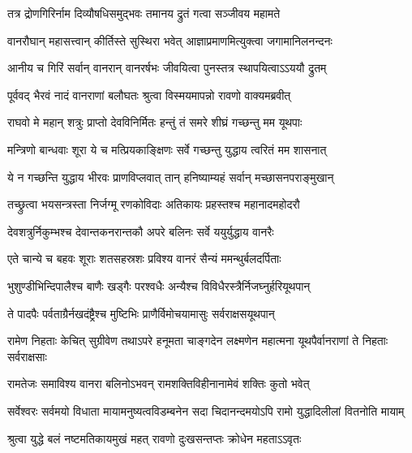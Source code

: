 \twolineshloka
{तत्र द्रोणगिरिर्नाम दिव्यौषधिसमुद्भवः}
{तमानय द्रुतं गत्वा सञ्जीवय महामते} %

\twolineshloka
{वानरौघान् महासत्त्वान् कीर्तिस्ते सुस्थिरा भवेत्}
{आज्ञाप्रमाणमित्युक्त्वा जगामानिलनन्दनः} %

\twolineshloka
{आनीय च गिरिं सर्वान् वानरान् वानरर्षभः}
{जीवयित्वा पुनस्तत्र स्थापयित्वाऽऽययौ द्रुतम्} %

\twolineshloka
{पूर्ववद् भैरवं नादं वानराणां बलौघतः}
{श्रुत्वा विस्मयमापन्नो रावणो वाक्यमब्रवीत्} %

\twolineshloka
{राघवो मे महान् शत्रुः प्राप्तो देवविनिर्मितः}
{हन्तुं तं समरे शीघ्रं गच्छन्तु मम यूथपाः} %

\twolineshloka
{मन्त्रिणो बान्धवाः शूरा ये च मत्प्रियकाङ्क्षिणः}
{सर्वे गच्छन्तु युद्धाय त्वरितं मम शासनात्} %

\twolineshloka
{ये न गच्छन्ति युद्धाय भीरवः प्राणविप्लवात्}
{तान् हनिष्याम्यहं सर्वान् मच्छासनपराङ्मुखान्} %

\twolineshloka
{तच्छ्रुत्वा भयसन्त्रस्ता निर्जग्मू रणकोविदाः}
{अतिकायः प्रहस्तश्च महानादमहोदरौ} %

\twolineshloka
{देवशत्रुर्निकुम्भश्च देवान्तकनरान्तकौ}
{अपरे बलिनः सर्वे ययुर्युद्धाय वानरैः} %

\twolineshloka
{एते चान्ये च बहवः शूराः शतसहस्रशः}
{प्रविश्य वानरं सैन्यं ममन्थुर्बलदर्पिताः} %

\twolineshloka
{भुशुण्डीभिन्दिपालैश्च बाणैः खड्गैः परश्वधैः}
{अन्यैश्च विविधैरस्त्रैर्निजघ्नुर्हरियूथपान्} %

\twolineshloka
{ते पादपैः पर्वताग्रैर्नखदंष्ट्रैश्च मुष्टिभिः}
{प्राणैर्विमोचयामासुः सर्वराक्षसयूथपान्} %

\threelineshloka
{रामेण निहताः केचित् सुग्रीवेण तथाऽपरे}
{हनूमता चाङ्गदेन लक्ष्मणेन महात्मना}
{यूथपैर्वानराणां ते निहताः सर्वराक्षसाः} %

\twolineshloka
{रामतेजः समाविश्य वानरा बलिनोऽभवन्}
{रामशक्तिविहीनानामेवं शक्तिः कुतो भवेत्} %

\fourlineindentedshloka
{सर्वेश्वरः सर्वमयो विधाता}
{मायामनुष्यत्वविडम्बनेन}
{सदा चिदानन्दमयोऽपि रामो}
{युद्धादिलीलां वितनोति मायाम्} %






\twolineshloka
{श्रुत्वा युद्धे बलं नष्टमतिकायमुखं महत्}
{रावणो दुःखसन्तप्तः क्रोधेन महताऽऽवृतः} %

